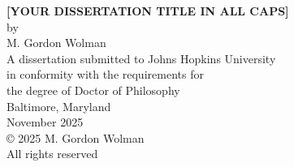 \begin{titlepage}
\thispagestyle{empty}
\begin{center}
    \doublespacing
    \vspace*{1.5in} 
    {\bf \Large [YOUR DISSERTATION TITLE IN ALL CAPS]} \\ 
    \vfill 
    {\Large by} \\ 
    {\Large M. Gordon Wolman}\\ 
    \vfill 
    {\large A dissertation submitted to Johns Hopkins University\\ in conformity with the requirements for\\ the degree of Doctor of Philosophy\\} 
    \vfill 
    {\large Baltimore, Maryland} \\ 
    {\large November 2025} \\ 
    \vfill
    {\large \copyright{} 2025 M. Gordon Wolman } \\ 
    {\large All rights reserved} \\ 
    \vfill
\end{center}
\newpage  
\end{titlepage}
